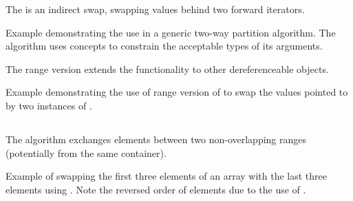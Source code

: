 The  is an indirect swap, swapping values behind two forward iterators.



\begin{box-note}
\footnotesize Example demonstrating the use  in a generic two-way partition algorithm. The algorithm uses concepts to constrain the acceptable types of its arguments.
\tcblower
{}
\end{box-note}

The range version extends the functionality to other dereferenceable objects.

\begin{box-note}
\footnotesize Example demonstrating the use of range version of  to swap the values pointed to by two instances of .
\tcblower
{}
\end{box-note}

\subsection{\texorpdfstring{}{\texttt{std::swap\_ranges}}}

The  algorithm exchanges elements between two non-overlapping ranges (potentially from the same container).


\begin{box-note}
\footnotesize Example of swapping the first three elements of an array with the last three elements using . Note the reversed order of elements due to the use of .
\tcblower
{}
\end{box-note}